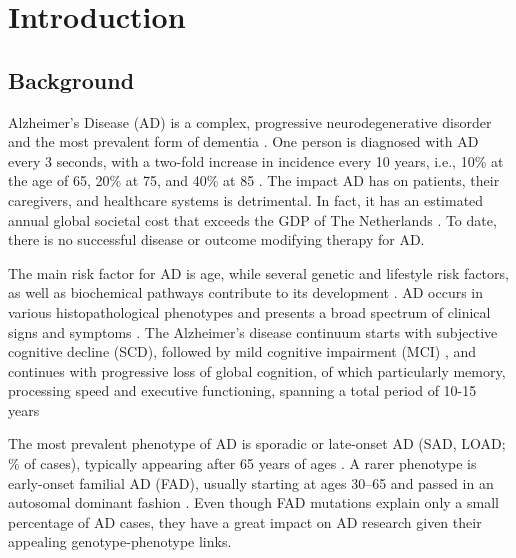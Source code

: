 \documentclass{amsart}
\theoremstyle{plain}
\newcommand{\mainmatter}{
    \newpage
    \pagenumbering{arabic}  %
}
\begin{document}
\mainmatter

\section{Introduction}\label{Intro}
\subsection{Background}
Alzheimer’s Disease (AD) is a complex, progressive neurodegenerative disorder and the most prevalent form of dementia \cite{Penke2023NewDisease}. One person is diagnosed with AD every 3 seconds, with a two-fold increase in incidence every 10 years, i.e., 10\% at the age of 65, 20\% at 75, and 40\% at 85 \cite{MartinPrince2015WorldTrends}. The impact AD has on patients, their caregivers, and healthcare systems is detrimental. In fact, it has an estimated annual global societal cost that exceeds the GDP of The Netherlands \cite{Wimo2023The2019}. To date, there is no successful disease or outcome modifying therapy for AD.

The main risk factor for AD is age, while several genetic and lifestyle risk factors, as well as biochemical pathways contribute to its development \cite{Penke2023NewDisease}. AD occurs in various histopathological phenotypes and presents a broad spectrum of clinical signs and symptoms \cite{Heneka2015NeuroinflammationDisease, Edwards2019ANeurodegeneration}. The Alzheimer's disease continuum starts with subjective cognitive decline (SCD), followed by mild cognitive impairment (MCI) \cite{Rasmussen2019AlzheimersDiagnosis}, and continues with progressive loss of global cognition, of which particularly memory, processing speed and executive functioning, spanning a total period of 10-15 years \cite{Scheltens2016AlzheimersDisease} 

The most prevalent phenotype of AD is sporadic or late-onset AD (SAD, LOAD; \% of cases), typically appearing after 65 years of ages \cite{Beydoun2014EpidemiologicMeta-analysis}. A rarer phenotype is early-onset familial AD (FAD), usually starting at ages 30–65 and passed in an autosomal dominant fashion \cite{VanCauwenberghe2015ThePerspectives}.
Even though FAD mutations explain only a small percentage of AD cases, they have a great impact on AD research given their appealing genotype-phenotype links.
\end{document}
